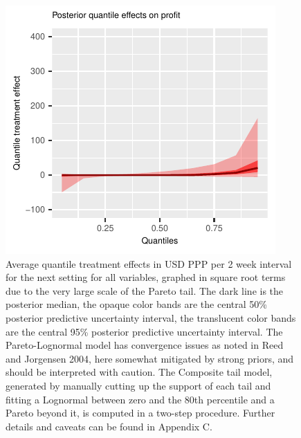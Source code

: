 \documentclass[english,12pt]{article}\usepackage{lmodern}
\numberwithin{equation}{section}
\begin{document}
\begin{figure}[h!]
          \includegraphics[scale=0.4]{posterior_parent_quantile_TEs_profit_lognormal.pdf}

  \caption{ \small Average quantile treatment effects in USD PPP per 2 week interval for the next setting for all variables, graphed in square root terms due to the very large scale of the Pareto tail. The dark line is the posterior median, the opaque color bands are the central 50\% posterior predictive uncertainty interval, the translucent color bands are the central 95\% posterior predictive uncertainty interval. The Pareto-Lognormal model has convergence issues as noted in Reed and Jorgensen 2004, here somewhat mitigated by strong priors, and should be interpreted with caution. The Composite tail model, generated by manually cutting up the support of each tail and fitting a Lognormal between zero and the 80th percentile and a Pareto beyond it, is computed in a two-step procedure. Further details and caveats can be found in Appendix C.} \label{complex quantiles}
\end{figure}

\clearpage









\end{document}
